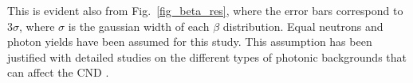 This is evident also from Fig.~\ref{fig_beta_res}, where the error bars correspond to $3 \sigma$, where $\sigma$ is the gaussian width of each $\beta$ distribution. Equal neutrons and photon yields have been assumed for this study. This assumption has been justified with detailed studies on the different types of photonic backgrounds that can affect the CND \cite{proposal}.

